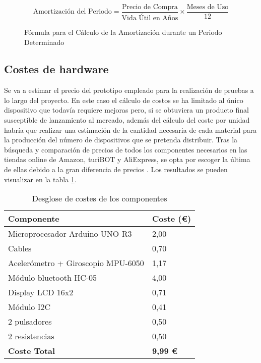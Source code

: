 \begin{figure}[h]
    \centering
    \[
    \text{Amortización del Periodo} = \frac{\text{Precio de Compra}}{\text{Vida Útil en Años}} \times \frac{\text{Meses de Uso}}{12}
    \]
    \caption{Fórmula para el Cálculo de la Amortización durante un Periodo Determinado}
    \label{fig:amortizacion-portatil}
\end{figure}

\subsection{Costes de hardware}
Se va a estimar el precio del prototipo empleado para la realización de pruebas a lo largo del proyecto. En este caso el cálculo de costos se ha limitado al único dispositivo que todavía requiere mejoras pero, si se obtuviera un producto final susceptible de lanzamiento al mercado, además del cálculo del coste por unidad habría que realizar una estimación de la cantidad necesaria de cada material para la producción del número de dispositivos que se pretenda distribuir.
Tras la búsqueda y comparación de precios de todos los componentes necesarios en las tiendas online de Amazon, turiBOT y AliExpress, se opta por escoger la última de ellas debido a la gran diferencia de precios \cite{AliExpre51:online}. Los resultados se pueden visualizar en la tabla \ref{tab:costesComponentes}.

\begin{table}[]
    \centering
    \begin{tabular}{ll}
        \hline
        \rowcolor[HTML]{FFFFFF} 
        \textbf{Componente} & \textbf{Coste (€)} \\ \hline
        \rowcolor[HTML]{EFEFEF} 
        Microprocesador Arduino UNO R3 & 2,00 \\ \hline
        \rowcolor[HTML]{FFFFFF} 
        Cables & 0,70 \\ \hline
        \rowcolor[HTML]{EFEFEF} 
        Acelerómetro + Giroscopio MPU-6050 & 1,17 \\ \hline
        \rowcolor[HTML]{FFFFFF} 
        Módulo bluetooth HC-05 & 4,00 \\ \hline
        \rowcolor[HTML]{EFEFEF} 
        Display LCD 16x2 & 0,71 \\ \hline
        \rowcolor[HTML]{FFFFFF} 
        Módulo I2C & 0,41 \\ \hline
        \rowcolor[HTML]{EFEFEF} 
        2 pulsadores & 0,50 \\ \hline
        \rowcolor[HTML]{FFFFFF} 
        2 resistencias & 0,50 \\ \hline
        \rowcolor[HTML]{C0C0C0} 
        \textbf{Coste Total} & \textbf{9,99 €} \\ \hline
    \end{tabular}
    \caption{Desglose de costes de los componentes}
    \label{tab:costesComponentes}
\end{table}


